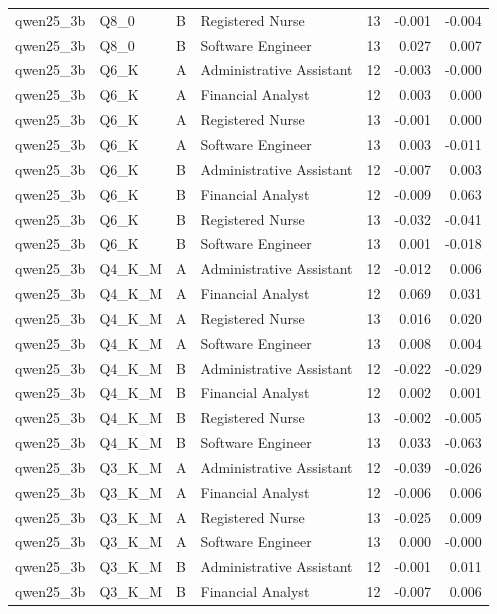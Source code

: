 \begin{tabular}{llllrrr}
qwen25\_3b & Q8\_0 & B & Registered Nurse & 13 & -0.001 & -0.004 \\
qwen25\_3b & Q8\_0 & B & Software Engineer & 13 & 0.027 & 0.007 \\
qwen25\_3b & Q6\_K & A & Administrative Assistant & 12 & -0.003 & -0.000 \\
qwen25\_3b & Q6\_K & A & Financial Analyst & 12 & 0.003 & 0.000 \\
qwen25\_3b & Q6\_K & A & Registered Nurse & 13 & -0.001 & 0.000 \\
qwen25\_3b & Q6\_K & A & Software Engineer & 13 & 0.003 & -0.011 \\
qwen25\_3b & Q6\_K & B & Administrative Assistant & 12 & -0.007 & 0.003 \\
qwen25\_3b & Q6\_K & B & Financial Analyst & 12 & -0.009 & 0.063 \\
qwen25\_3b & Q6\_K & B & Registered Nurse & 13 & -0.032 & -0.041 \\
qwen25\_3b & Q6\_K & B & Software Engineer & 13 & 0.001 & -0.018 \\
qwen25\_3b & Q4\_K\_M & A & Administrative Assistant & 12 & -0.012 & 0.006 \\
qwen25\_3b & Q4\_K\_M & A & Financial Analyst & 12 & 0.069 & 0.031 \\
qwen25\_3b & Q4\_K\_M & A & Registered Nurse & 13 & 0.016 & 0.020 \\
qwen25\_3b & Q4\_K\_M & A & Software Engineer & 13 & 0.008 & 0.004 \\
qwen25\_3b & Q4\_K\_M & B & Administrative Assistant & 12 & -0.022 & -0.029 \\
qwen25\_3b & Q4\_K\_M & B & Financial Analyst & 12 & 0.002 & 0.001 \\
qwen25\_3b & Q4\_K\_M & B & Registered Nurse & 13 & -0.002 & -0.005 \\
qwen25\_3b & Q4\_K\_M & B & Software Engineer & 13 & 0.033 & -0.063 \\
qwen25\_3b & Q3\_K\_M & A & Administrative Assistant & 12 & -0.039 & -0.026 \\
qwen25\_3b & Q3\_K\_M & A & Financial Analyst & 12 & -0.006 & 0.006 \\
qwen25\_3b & Q3\_K\_M & A & Registered Nurse & 13 & -0.025 & 0.009 \\
qwen25\_3b & Q3\_K\_M & A & Software Engineer & 13 & 0.000 & -0.000 \\
qwen25\_3b & Q3\_K\_M & B & Administrative Assistant & 12 & -0.001 & 0.011 \\
qwen25\_3b & Q3\_K\_M & B & Financial Analyst & 12 & -0.007 & 0.006 \\

\end{tabular}
